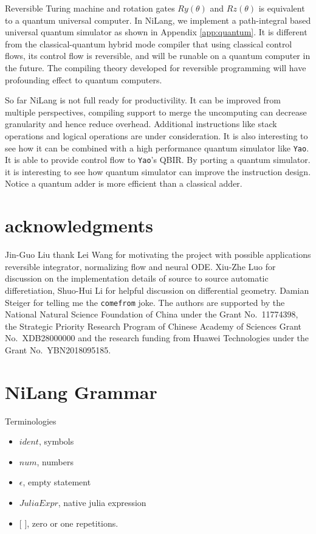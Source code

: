 \documentclass[aps,twocolumn,longbibliography,english,superscriptaddress,prr]{revtex4-1}
\newcommand{\<}{\langle}
\renewcommand{\>}{\rangle}
\newcommand{\App}[1]{Appendix \ref{#1}}
\theoremstyle{definition}\newtheorem{definition}{\textit{Definition}}
\begin{document}
Reversible Turing machine and rotation gates $Ry(\theta)$ and $Rz(\theta)$ is equivalent to a quantum universal computer.
In NiLang, we implement a path-integral based universal quantum simulator as shown in \App{app:quantum}. It is different from the classical-quantum hybrid mode compiler that using classical control flows, its control flow is reversible, and will be runable on a quantum computer in the future.
The compiling theory developed for reversible programming will have profounding effect to quantum computers.

So far NiLang is not full ready for productivility. It can be improved from multiple perspectives, compiling support to merge the uncomputing can decrease granularity and hence reduce overhead. Additional instructions like stack operations and logical operations are under consideration. It is also interesting to see how it can be combined with a high performance quantum simulator like \texttt{Yao}. It is able to provide control flow to \texttt{Yao}'s QBIR. By porting a quantum simulator. it is interesting to see how quantum simulator can improve the instruction design. Notice a quantum adder is more efficient than a classical adder.

\section{acknowledgments}
Jin-Guo Liu thank Lei Wang for motivating the project with possible applications reversible integrator, normalizing flow and neural ODE.
Xiu-Zhe Luo for discussion on the implementation details of source to source automatic differetiation,
Shuo-Hui Li for helpful discussion on differential geometry.
Damian Steiger for telling me the \texttt{comefrom} joke.
The authors are supported by the National Natural Science Foundation of China under the Grant No.~11774398, the Strategic Priority Research Program of Chinese Academy of Sciences Grant No.~XDB28000000 and the research funding from Huawei Technologies under the Grant No.~YBN2018095185.




\pagebreak
\appendix

\section{NiLang Grammar}\label{app:grammar}

Terminologies
\begin{itemize}
    \item $ident$, symbols
    \item $num$, numbers
    \item $\epsilon$, empty statement
    \item $JuliaExpr$, native julia expression
    \item $[$ $]$,  zero or one repetitions.
\end{itemize}
\end{document}
